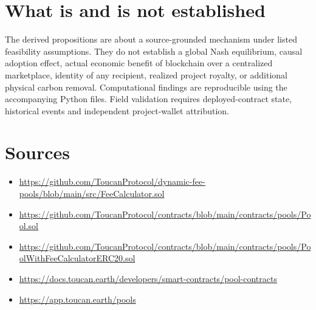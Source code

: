 \documentclass[11pt]{article}
\begin{document}
\section{What is and is not established}
The derived propositions are about a source-grounded mechanism under listed feasibility assumptions. They do not establish a global Nash equilibrium, causal adoption effect, actual economic benefit of blockchain over a centralized marketplace, identity of any recipient, realized project royalty, or additional physical carbon removal. Computational findings are reproducible using the accompanying Python files. Field validation requires deployed-contract state, historical events and independent project-wallet attribution.

\section*{Sources}
\begin{itemize}
\item \url{https://github.com/ToucanProtocol/dynamic-fee-pools/blob/main/src/FeeCalculator.sol}
\item \url{https://github.com/ToucanProtocol/contracts/blob/main/contracts/pools/Pool.sol}
\item \url{https://github.com/ToucanProtocol/contracts/blob/main/contracts/pools/PoolWithFeeCalculatorERC20.sol}
\item \url{https://docs.toucan.earth/developers/smart-contracts/pool-contracts}
\item \url{https://app.toucan.earth/pools}
\end{itemize}
\end{document}
